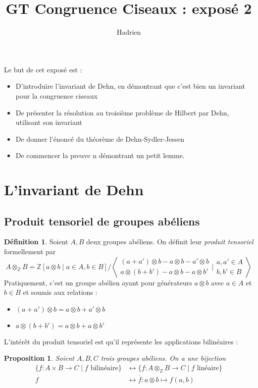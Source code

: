 \documentclass{article}
\title{GT Congruence Ciseaux : exposé 2}
\author{Hadrien}
\date{}
\newcommand{\Z}{\mathbb{Z}}
\theoremstyle{plain}
\newtheorem{proposition}[theorem]{Proposition}
\theoremstyle{definition}
\newtheorem{definition}[theorem]{Définition}
\theoremstyle{remark}
\begin{document}
\maketitle

Le but de cet exposé est :
\begin{itemize}
    \item D'introduire l'invariant de Dehn, en démontrant que c'est bien un invariant pour la congruence ciseaux
    \item De présenter la résolution au troisième problème de Hilbert par Dehn, utilisant son invariant
    \item De donner l'énoncé du théorème de Dehn-Sydler-Jessen
    \item De commencer la preuve n démontrant un petit lemme.
\end{itemize}

\section{L'invariant de Dehn}

\subsection{Produit tensoriel de groupes abéliens}

\begin{definition}
    Soient $A,B$ deux groupes abéliens. On définit leur \emph{produit tensoriel} formellement par
    \[A \otimes_\Z B = \Z[a \otimes b \mid a \in A, b \in B]/\left\langle \begin{array}{c}
        (a+a') \otimes b - a \otimes b - a' \otimes b \\
        a \otimes (b+b') - a \otimes b - a \otimes b'
    \end{array} \Big| \begin{array}{c}
        a,a' \in A \\
        b,b' \in B
    \end{array} \right\rangle\]
    Pratiquement, c'est un groupe abélien ayant pour générateurs $a\otimes b$ avec $a \in A$ et $b \in B$ et soumis aux relations :
    \begin{itemize}
        \item $(a+a') \otimes b = a \otimes b + a' \otimes b$
        \item $a \otimes (b+b') = a \otimes b + a \otimes b'$
    \end{itemize}
\end{definition}
L'intérêt du produit tensoriel est qu'il \og représente \fg les applications bilinéaires :
\begin{proposition}
    Soient $A,B,C$ trois groupes abéliens. On a une bijection
    \begin{align*}
        \{f : A \times B \to C \mid f \text{ bilinéaire}\} & \longleftrightarrow \{f : A \otimes_\Z B \to C \mid f \text{ linéaire}\} \\
        f & \longleftrightarrow \overline{f} : a\otimes b \mapsto f(a,b)
    \end{align*}
\end{proposition}
\end{document}
